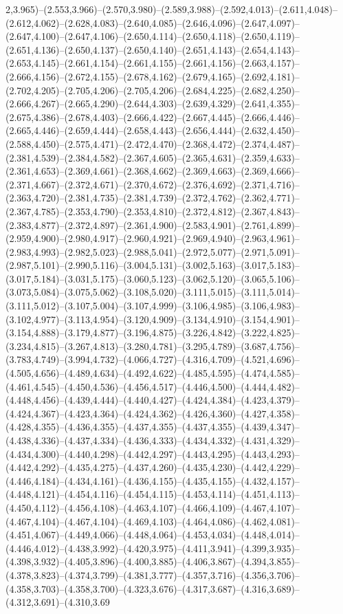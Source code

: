 2,3.965)--(2.553,3.966)--(2.570,3.980)--(2.589,3.988)--(2.592,4.013)--(2.611,4.048)--(2.612,4.062)--(2.628,4.083)--(2.640,4.085)--(2.646,4.096)--(2.647,4.097)--(2.647,4.100)--(2.647,4.106)--(2.650,4.114)--(2.650,4.118)--(2.650,4.119)--(2.651,4.136)--(2.650,4.137)--(2.650,4.140)--(2.651,4.143)--(2.654,4.143)--(2.653,4.145)--(2.661,4.154)--(2.661,4.155)--(2.661,4.156)--(2.663,4.157)--(2.666,4.156)--(2.672,4.155)--(2.678,4.162)--(2.679,4.165)--(2.692,4.181)--(2.702,4.205)--(2.705,4.206)--(2.705,4.206)--(2.684,4.225)--(2.682,4.250)--(2.666,4.267)--(2.665,4.290)--(2.644,4.303)--(2.639,4.329)--(2.641,4.355)--(2.675,4.386)--(2.678,4.403)--(2.666,4.422)--(2.667,4.445)--(2.666,4.446)--(2.665,4.446)--(2.659,4.444)--(2.658,4.443)--(2.656,4.444)--(2.632,4.450)--(2.588,4.450)--(2.575,4.471)--(2.472,4.470)--(2.368,4.472)--(2.374,4.487)--(2.381,4.539)--(2.384,4.582)--(2.367,4.605)--(2.365,4.631)--(2.359,4.633)--(2.361,4.653)--(2.369,4.661)--(2.368,4.662)--(2.369,4.663)--(2.369,4.666)--(2.371,4.667)--(2.372,4.671)--(2.370,4.672)--(2.376,4.692)--(2.371,4.716)--(2.363,4.720)--(2.381,4.735)--(2.381,4.739)--(2.372,4.762)--(2.362,4.771)--(2.367,4.785)--(2.353,4.790)--(2.353,4.810)--(2.372,4.812)--(2.367,4.843)--(2.383,4.877)--(2.372,4.897)--(2.361,4.900)--(2.583,4.901)--(2.761,4.899)--(2.959,4.900)--(2.980,4.917)--(2.960,4.921)--(2.969,4.940)--(2.963,4.961)--(2.983,4.993)--(2.982,5.023)--(2.988,5.041)--(2.972,5.077)--(2.971,5.091)--(2.987,5.101)--(2.990,5.116)--(3.004,5.131)--(3.002,5.163)--(3.017,5.183)--(3.017,5.184)--(3.031,5.175)--(3.060,5.123)--(3.062,5.120)--(3.065,5.106)--(3.073,5.084)--(3.075,5.062)--(3.108,5.020)--(3.111,5.015)--(3.111,5.014)--(3.111,5.012)--(3.107,5.004)--(3.107,4.999)--(3.106,4.985)--(3.106,4.983)--(3.102,4.977)--(3.113,4.954)--(3.120,4.909)--(3.134,4.910)--(3.154,4.901)--(3.154,4.888)--(3.179,4.877)--(3.196,4.875)--(3.226,4.842)--(3.222,4.825)--(3.234,4.815)--(3.267,4.813)--(3.280,4.781)--(3.295,4.789)--(3.687,4.756)--(3.783,4.749)--(3.994,4.732)--(4.066,4.727)--(4.316,4.709)--(4.521,4.696)--(4.505,4.656)--(4.489,4.634)--(4.492,4.622)--(4.485,4.595)--(4.474,4.585)--(4.461,4.545)--(4.450,4.536)--(4.456,4.517)--(4.446,4.500)--(4.444,4.482)--(4.448,4.456)--(4.439,4.444)--(4.440,4.427)--(4.424,4.384)--(4.423,4.379)--(4.424,4.367)--(4.423,4.364)--(4.424,4.362)--(4.426,4.360)--(4.427,4.358)--(4.428,4.355)--(4.436,4.355)--(4.437,4.355)--(4.437,4.355)--(4.439,4.347)--(4.438,4.336)--(4.437,4.334)--(4.436,4.333)--(4.434,4.332)--(4.431,4.329)--(4.434,4.300)--(4.440,4.298)--(4.442,4.297)--(4.443,4.295)--(4.443,4.293)--(4.442,4.292)--(4.435,4.275)--(4.437,4.260)--(4.435,4.230)--(4.442,4.229)--(4.446,4.184)--(4.434,4.161)--(4.436,4.155)--(4.435,4.155)--(4.432,4.157)--(4.448,4.121)--(4.454,4.116)--(4.454,4.115)--(4.453,4.114)--(4.451,4.113)--(4.450,4.112)--(4.456,4.108)--(4.463,4.107)--(4.466,4.109)--(4.467,4.107)--(4.467,4.104)--(4.467,4.104)--(4.469,4.103)--(4.464,4.086)--(4.462,4.081)--(4.451,4.067)--(4.449,4.066)--(4.448,4.064)--(4.453,4.034)--(4.448,4.014)--(4.446,4.012)--(4.438,3.992)--(4.420,3.975)--(4.411,3.941)--(4.399,3.935)--(4.398,3.932)--(4.405,3.896)--(4.400,3.885)--(4.406,3.867)--(4.394,3.855)--(4.378,3.823)--(4.374,3.799)--(4.381,3.777)--(4.357,3.716)--(4.356,3.706)--(4.358,3.703)--(4.358,3.700)--(4.323,3.676)--(4.317,3.687)--(4.316,3.689)--(4.312,3.691)--(4.310,3.69